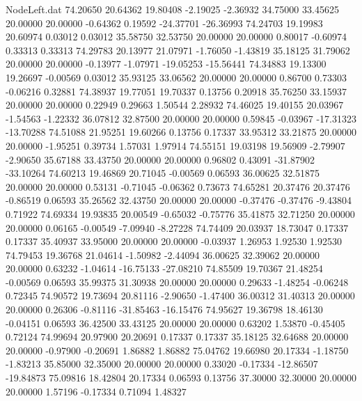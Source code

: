 \begin{filecontents}{NodeLeft.dat}
  74.20650   20.64362   19.80408    -2.19025   -2.36932   34.75000   33.45625   20.00000   20.00000   -0.64362    0.19592  -24.37701  -26.36993
  74.24703   19.19983   20.60974     0.03012    0.03012   35.58750   32.53750   20.00000   20.00000    0.80017   -0.60974    0.33313    0.33313
  74.29783   20.13977   21.07971    -1.76050   -1.43819   35.18125   31.79062   20.00000   20.00000   -0.13977   -1.07971  -19.05253  -15.56441
  74.34883   19.13300   19.26697    -0.00569    0.03012   35.93125   33.06562   20.00000   20.00000    0.86700    0.73303   -0.06216    0.32881
  74.38937   19.77051   19.70337     0.13756    0.20918   35.76250   33.15937   20.00000   20.00000    0.22949    0.29663    1.50544    2.28932
  74.46025   19.40155   20.03967    -1.54563   -1.22332   36.07812   32.87500   20.00000   20.00000    0.59845   -0.03967  -17.31323  -13.70288
  74.51088   21.95251   19.60266     0.13756    0.17337   33.95312   33.21875   20.00000   20.00000   -1.95251    0.39734    1.57031    1.97914
  74.55151   19.03198   19.56909    -2.79907   -2.90650   35.67188   33.43750   20.00000   20.00000    0.96802    0.43091  -31.87902  -33.10264
  74.60213   19.46869   20.71045    -0.00569    0.06593   36.00625   32.51875   20.00000   20.00000    0.53131   -0.71045   -0.06362    0.73673
  74.65281   20.37476   20.37476    -0.86519    0.06593   35.26562   32.43750   20.00000   20.00000   -0.37476   -0.37476   -9.43804    0.71922
  74.69334   19.93835   20.00549    -0.65032   -0.75776   35.41875   32.71250   20.00000   20.00000    0.06165   -0.00549   -7.09940   -8.27228
  74.74409   20.03937   18.73047     0.17337    0.17337   35.40937   33.95000   20.00000   20.00000   -0.03937    1.26953    1.92530    1.92530
  74.79453   19.36768   21.04614    -1.50982   -2.44094   36.00625   32.39062   20.00000   20.00000    0.63232   -1.04614  -16.75133  -27.08210
  74.85509   19.70367   21.48254    -0.00569    0.06593   35.99375   31.30938   20.00000   20.00000    0.29633   -1.48254   -0.06248    0.72345
  74.90572   19.73694   20.81116    -2.90650   -1.47400   36.00312   31.40313   20.00000   20.00000    0.26306   -0.81116  -31.85463  -16.15476
  74.95627   19.36798   18.46130    -0.04151    0.06593   36.42500   33.43125   20.00000   20.00000    0.63202    1.53870   -0.45405    0.72124
  74.99694   20.97900   20.20691     0.17337    0.17337   35.18125   32.64688   20.00000   20.00000   -0.97900   -0.20691    1.86882    1.86882
  75.04762   19.66980   20.17334    -1.18750   -1.83213   35.85000   32.35000   20.00000   20.00000    0.33020   -0.17334  -12.86507  -19.84873
  75.09816   18.42804   20.17334     0.06593    0.13756   37.30000   32.30000   20.00000   20.00000    1.57196   -0.17334    0.71094    1.48327

\end{filecontents}
